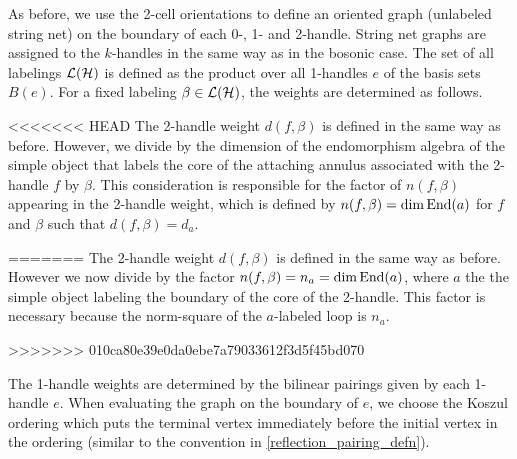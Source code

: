 As before, we use the 2-cell orientations to define an oriented graph (unlabeled string net) on the boundary of each 0-, 1- and 2-handle.
String net graphs are assigned to the $k$-handles in the same way as in the bosonic case. 
The set of all labelings $\mathcal{L}(\mathcal{H})$ is defined as the product over all 1-handles $e$ of the basis sets $B(e)$.
For a fixed labeling $\beta \in \mathcal{L}(\mathcal{H})$, the weights are determined as follows.

<<<<<<< HEAD
The 2-handle weight $d(f, \beta)$ is defined in the same way as before. However, 
we divide
by the dimension 
of the endomorphism algebra of the simple object that labels the core of the attaching annulus associated with the 2-handle $f$ by $\beta$. 
This consideration is responsible for the factor of $n(f,\beta)$ appearing 
in the 2-handle weight, 
which is defined by $n(f,\beta)=\dim \text{End}(a)$ for $f$ and $\beta$
such that $d(f,\beta)=d_a$. 

=======
The 2-handle weight $d(f, \beta)$ is defined in the same way as before. 
However we now divide by the factor $n(f, \beta) = n_a = \dim\text{End}(a)$,
where $a$ the the simple object labeling the boundary of the core of the 2-handle.
This factor is necessary because the norm-square of the $a$-labeled loop is $n_a$.

>>>>>>> 010ca80e39e0da0ebe7a79033612f3d5f45bd070

The 1-handle weights are determined by the bilinear pairings given by each 1-handle $e$. 
When evaluating the graph on the boundary of $e$, we choose the Koszul ordering which puts the terminal vertex
immediately before the initial vertex in the ordering (similar to the convention in \eqref{reflection_pairing_defn}).


